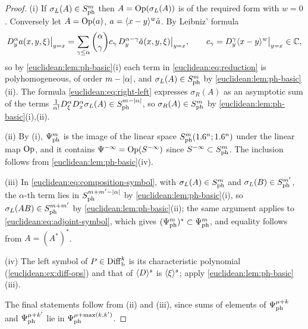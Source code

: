 \begin{proof}
  (i) If $\sigma_L(A)\in S^{m}_{\mathrm{ph}}$ then $A=\operatorname{Op}(\sigma_L(A))$ is of the required form
  with $w=0$. Conversely let $A=\operatorname{Op}(a)$, $a=\langle x-y\rangle^w\tilde a$. By
  Leibniz' formula
  \begin{equation*}
    D^\alpha_ya(x,y,\xi)\big|_{y=x}=\sum_{\gamma\le\alpha}\binom\alpha\gamma
    c_\gamma\,D^{\alpha-\gamma}_y\tilde a(x,y,\xi)\big|_{y=x},\qquad
    c_\gamma=D^\gamma_y\langle x-y\rangle^w\big|_{y=x}\in\mathbb{C},
  \end{equation*}
  so by \cref{euclidean:lem:ph-basic}(i) each term in
  \eqref{euclidean:eq:reduction} is polyhomogeneous, of order $m-\lvert \alpha\rvert$,
  and $\sigma_L(A)\in S^{m}_{\mathrm{ph}}$ by \cref{euclidean:lem:ph-basic}(ii). The formula
  \eqref{euclidean:eq:right-left} expresses $\sigma_R(A)$ as an asymptotic sum
  of the terms $\frac{1}{\alpha!}D_\xi^\alpha D_x^\alpha\sigma_L(A)\in S^{m-\lvert \alpha\rvert}_{\mathrm{ph}}$, so
  $\sigma_R(A)\in S^{m}_{\mathrm{ph}}$ by \cref{euclidean:lem:ph-basic}(i),(ii).

  (ii) By (i), $\Psi^{m}_{\mathrm{ph}}$ is the image of the linear space
  $S^{m}_{\mathrm{ph}}(1.6^n;1.6^n)$ under the linear map $\operatorname{Op}$, and it contains
  $\Psi^{-\infty}=\operatorname{Op}(S^{-\infty})$ since $S^{-\infty}\subset S^{m}_{\mathrm{ph}}$. The inclusion
  follows from \cref{euclidean:lem:ph-basic}(iv).

  (iii) In \eqref{euclidean:eq:composition-symbol}, with $\sigma_L(A)\in S^{m}_{\mathrm{ph}}$
  and $\sigma_L(B)\in S^{m'}_{\mathrm{ph}}$, the $\alpha$-th term lies in
  $S^{m+m'-\lvert \alpha\rvert}_{\mathrm{ph}}$ by \cref{euclidean:lem:ph-basic}(i), so
  $\sigma_L(AB)\in S^{m+m'}_{\mathrm{ph}}$ by \cref{euclidean:lem:ph-basic}(ii); the same
  argument applies to \eqref{euclidean:eq:adjoint-symbol}, which gives
  $(\Psi^{m}_{\mathrm{ph}})^*\subset\Psi^{m}_{\mathrm{ph}}$, and equality follows
  from $A=(A^*)^*$.

  (iv) The left symbol of $P\in\operatorname{Diff}^{k}_{\mathrm b}$ is its characteristic
  polynomial (\cref{euclidean:ex:diff-ops}) and that of $\langle D\rangle^s$ is $\langle \xi\rangle^s$;
  apply \cref{euclidean:lem:ph-basic}(iii).

  The final statements follow from (ii) and (iii), since sums of elements of
  $\Psi^{\mu+k}_{\mathrm{ph}}$ and $\Psi^{\mu+k'}_{\mathrm{ph}}$ lie in
  $\Psi^{\mu+\max(k,k')}_{\mathrm{ph}}$.
\end{proof}

